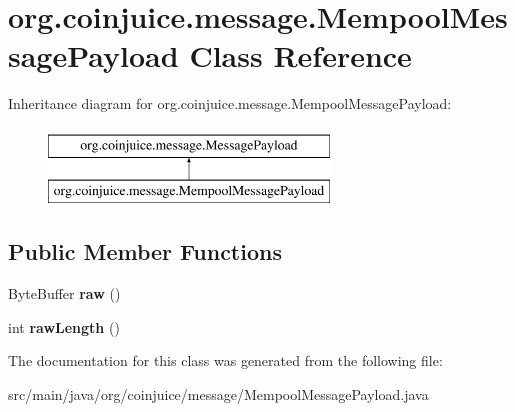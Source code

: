\hypertarget{classorg_1_1coinjuice_1_1message_1_1_mempool_message_payload}{\section{org.\-coinjuice.\-message.\-Mempool\-Message\-Payload Class Reference}
\label{classorg_1_1coinjuice_1_1message_1_1_mempool_message_payload}
}
Inheritance diagram for org.\-coinjuice.\-message.\-Mempool\-Message\-Payload\-:\begin{figure}[H]
\begin{center}
\leavevmode
\includegraphics[height=2.000000cm]{classorg_1_1coinjuice_1_1message_1_1_mempool_message_payload}
\end{center}
\end{figure}
\subsection*{Public Member Functions}
\begin{DoxyCompactItemize}
\item 
\hypertarget{classorg_1_1coinjuice_1_1message_1_1_mempool_message_payload_a5243426f06a947f051b5a53a9d8c396c}{Byte\-Buffer {\bfseries raw} ()}\label{classorg_1_1coinjuice_1_1message_1_1_mempool_message_payload_a5243426f06a947f051b5a53a9d8c396c}

\item 
\hypertarget{classorg_1_1coinjuice_1_1message_1_1_mempool_message_payload_a2a91c72a15e511f02b2b56fdad1c4b9a}{int {\bfseries raw\-Length} ()}\label{classorg_1_1coinjuice_1_1message_1_1_mempool_message_payload_a2a91c72a15e511f02b2b56fdad1c4b9a}

\end{DoxyCompactItemize}


The documentation for this class was generated from the following file\-:\begin{DoxyCompactItemize}
\item 
src/main/java/org/coinjuice/message/Mempool\-Message\-Payload.\-java\end{DoxyCompactItemize}
